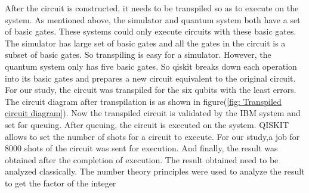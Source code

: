 After the circuit is constructed, it needs to be transpiled so as to execute on the system. As mentioned above, the simulator and quantum system both have a set of basic gates. These systems could only execute circuits with these basic gates. The simulator has large set of basic gates and all the gates in the circuit is a subset of basic gates. So transpiling is easy for a simulator. However, the quantum system only has five basic gates. So qiskit breaks down each operation into its basic gates and prepares a new circuit equivalent to the original circuit. For our study, the circuit was transpiled for the six qubits with the least errors. The circuit diagram after transpilation is as shown in figure(\ref{fig: Transpiled circuit diagram}).  Now the transpiled circuit is validated by the IBM system and set for queuing. After queuing, the circuit is executed on the system. QISKIT allows to set the number of shots for a circuit to execute. For our study,a job for 8000 shots of the circuit was sent for execution. And finally, the result was obtained after the completion of execution. The result obtained need to be analyzed classically. The number theory principles were used to analyze the result to get the factor of the integer
